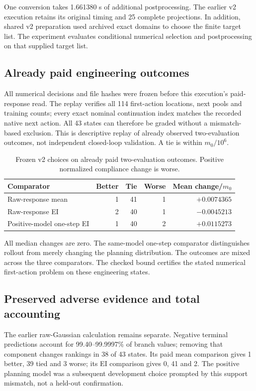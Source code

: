 One conversion takes 1.661380 s of additional postprocessing. The earlier v2 execution retains its original timing and 25 complete projections. In addition, shared v2 preparation used archived exact domains to choose the finite target list. The experiment evaluates conditional numerical selection and postprocessing on that supplied target list.

\subsection{Already paid engineering outcomes}

All numerical decisions and file hashes were frozen before this execution's paid-response read. The replay verifies all 114 first-action locations, next pools and training counts; every exact nominal continuation index matches the recorded native next action. All 43 states can therefore be graded without a mismatch-based exclusion. This is descriptive replay of already observed two-evaluation outcomes, not independent closed-loop validation. A tie is within $m_0/10^6$.

\begin{table}[htbp]\centering\small
\caption{Frozen v2 choices on already paid two-evaluation outcomes. Positive normalized compliance change is worse.}\label{tab:positive_paid}
\begin{tabular}{lrrrr}\toprule
Comparator & Better & Tie & Worse & Mean change/$m_0$\\\midrule
Raw-response mean & 1 & 41 & 1 & $+0.0074365$\\
Raw-response EI & 2 & 40 & 1 & $-0.0045213$\\
Positive-model one-step EI & 1 & 40 & 2 & $+0.0115273$\\
\bottomrule\end{tabular}\end{table}

All median changes are zero. The same-model one-step comparator distinguishes rollout from merely changing the planning distribution. The outcomes are mixed across the three comparators. The checked bound certifies the stated numerical first-action problem on these engineering states.

\subsection{Preserved adverse evidence and total accounting}

The earlier raw-Gaussian calculation remains separate. Negative terminal predictions account for 99.40--99.9997\% of branch values; removing that component changes rankings in 38 of 43 states. Its paid mean comparison gives 1 better, 39 tied and 3 worse; its EI comparison gives 0, 41 and 2. The positive planning model was a subsequent development choice prompted by this support mismatch, not a held-out confirmation.

